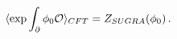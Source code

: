 \begin{equation}
\label{euclidean ads/cft} \langle \exp \int _{\partial} \phi_0 {\cal O} \rangle_{CFT} = Z_{SUGRA} (\phi_0) \, .
\end{equation}


